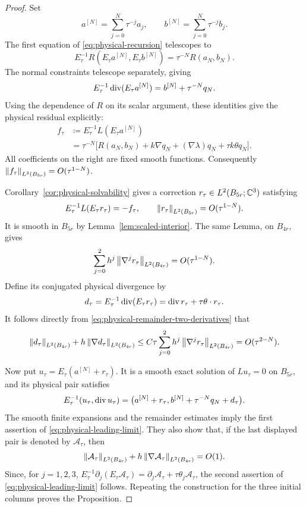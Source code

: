 \begin{proof}
Set
\[
 a^{[N]}=\sum_{j=0}^N\tau^{-j}a_j,
 \qquad b^{[N]}=\sum_{j=0}^N\tau^{-j}b_j.
\]
The first equation of \eqref{eq:physical-recursion} telescopes
to
\begin{equation}
\label{eq:truncated-vector-residual}
 E_\tau^{-1}R(E_\tau a^{[N]},E_\tau b^{[N]})
       =\tau^{-N}R(a_N,b_N).
\end{equation}
The normal constraints telescope separately, giving
\begin{equation}
\label{eq:truncated-divergence}
 E_\tau^{-1}\operatorname{div}(E_\tau a^{[N]})
       =b^{[N]}+\tau^{-N}q_N.
\end{equation}
Using the dependence of $R$ on its scalar argument, these
identities give the physical residual explicitly:
\begin{equation}
\label{eq:physical-truncated-residual}
\begin{aligned}
 f_\tau
 &\coloneqq E_\tau^{-1}L(E_\tau a^{[N]})\\
 &=\tau^{-N}\bigl[R(a_N,b_N)+k\nabla q_N
           +(\nabla\lambda)q_N+\tau k\theta q_N\bigr].
\end{aligned}
\end{equation}
All coefficients on the right are fixed smooth functions.
Consequently $\left\lVert f_\tau\right\rVert_{L^2(B_{5r})}=O(\tau^{1-N})$.

Corollary~\ref{cor:physical-solvability} gives a correction
$r_\tau\in L^2(B_{5r};\mathbb C^3)$ satisfying
\[
 E_\tau^{-1}L(E_\tau r_\tau)=-f_\tau,
 \qquad \left\lVert r_\tau\right\rVert_{L^2(B_{5r})}=O(\tau^{1-N}).
\]
It is smooth in $B_{5r}$ by Lemma~\ref{lem:scaled-interior}.
The same Lemma, on $B_{4r}$, gives
\begin{equation}
\label{eq:physical-remainder-two-derivatives}
 \sum_{j=0}^2h^j\left\lVert \nabla^jr_\tau\right\rVert_{L^2(B_{4r})}
                      =O(\tau^{1-N}).
\end{equation}
Define its conjugated physical divergence by
\[
 d_\tau=E_\tau^{-1}\operatorname{div}(E_\tau r_\tau)
             =\operatorname{div} r_\tau+\tau\theta\cdot r_\tau.
\]
It follows directly from
\eqref{eq:physical-remainder-two-derivatives} that
\begin{equation}
\label{eq:physical-divergence-remainder}
 \left\lVert d_\tau\right\rVert_{L^2(B_{4r})}
    +h\left\lVert \nabla d_\tau\right\rVert_{L^2(B_{4r})}
 \le C\tau\sum_{j=0}^2h^j
                    \left\lVert \nabla^jr_\tau\right\rVert_{L^2(B_{4r})}
 =O(\tau^{2-N}).
\end{equation}

Now put $u_\tau=E_\tau(a^{[N]}+r_\tau)$. It is a smooth exact
solution of $Lu_\tau=0$ on $B_{5r}$, and its physical pair
satisfies
\[
 E_\tau^{-1}(u_\tau,\operatorname{div} u_\tau)
  =\bigl(a^{[N]}+r_\tau,
         b^{[N]}+\tau^{-N}q_N+d_\tau\bigr).
\]
The smooth finite expansions and the remainder estimates imply
the first assertion of \eqref{eq:physical-leading-limit}.
They also show that, if the last displayed pair is denoted
by $\mathcal A_\tau$, then
\[
 \left\lVert \mathcal A_\tau\right\rVert_{L^2(B_{4r})}
       +h\left\lVert \nabla\mathcal A_\tau\right\rVert_{L^2(B_{4r})}=O(1).
\]
Since, for $j=1,2,3$,
$E_\tau^{-1}\partial_j(E_\tau\mathcal A_\tau)
=\partial_j\mathcal A_\tau+\tau\theta_j\mathcal A_\tau$,
the second assertion of \eqref{eq:physical-leading-limit}
follows. Repeating the construction for the three initial
columns proves the Proposition.
\end{proof}
